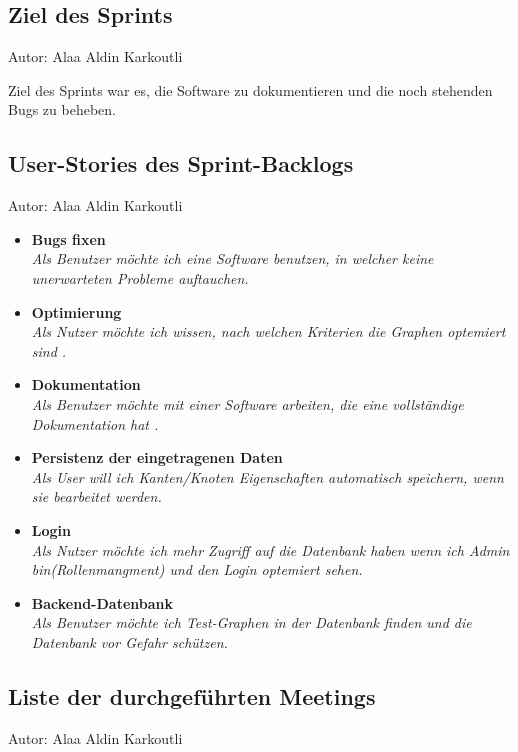 \subsection{Ziel des Sprints}
{\small Autor: Alaa Aldin Karkoutli}

Ziel des Sprints war es, die Software zu dokumentieren und die noch stehenden Bugs zu beheben.\\

\subsection{User-Stories des Sprint-Backlogs}
{\small Autor: Alaa Aldin Karkoutli}

\begin{itemize}
  \item \textbf{Bugs fixen}
        \\\textit{Als Benutzer möchte ich eine Software benutzen, in welcher keine unerwarteten Probleme auftauchen.}
  \item \textbf{ Optimierung }
        \\\textit{
        Als Nutzer möchte ich wissen, nach welchen Kriterien die Graphen optemiert sind .}
  \item \textbf{Dokumentation }
        \\\textit{
          Als Benutzer möchte mit einer Software arbeiten, die eine vollständige Dokumentation hat .}
  \item \textbf{Persistenz der eingetragenen Daten}
        \\\textit{
          Als User will ich Kanten/Knoten Eigenschaften automatisch speichern, wenn sie bearbeitet werden.}
  \item \textbf{Login}
        \\\textit{
          Als Nutzer möchte ich mehr Zugriff auf die Datenbank haben wenn ich Admin bin(Rollenmangment) und den Login optemiert sehen.}
  \item \textbf{Backend-Datenbank}
        \\\textit{
          Als Benutzer möchte ich Test-Graphen in der Datenbank finden und die Datenbank vor Gefahr schützen.}
\end{itemize}

\subsection{Liste der durchgeführten Meetings}
{\small Autor: Alaa Aldin Karkoutli}

